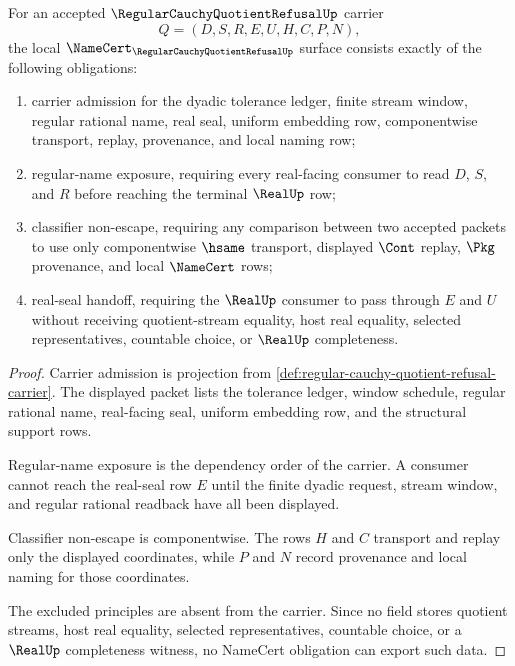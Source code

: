 \begin{theorem}
\label{thm:regular-cauchy-quotient-refusal-namecert-obligations}
For an accepted $\RegularCauchyQuotientRefusalUp$ carrier
$$
Q=(D,S,R,E,U,H,C,P,N),
$$
the local $\NameCert_{\RegularCauchyQuotientRefusalUp}$ surface consists exactly of the following obligations:
\begin{enumerate}
\item carrier admission for the dyadic tolerance ledger, finite stream window, regular rational name, real seal, uniform embedding row, componentwise transport, replay, provenance, and local naming row;
\item regular-name exposure, requiring every real-facing consumer to read $D$, $S$, and $R$ before reaching the terminal $\RealUp$ row;
\item classifier non-escape, requiring any comparison between two accepted packets to use only componentwise $\hsame$ transport, displayed $\Cont$ replay, $\Pkg$ provenance, and local $\NameCert$ rows;
\item real-seal handoff, requiring the $\RealUp$ consumer to pass through $E$ and $U$ without receiving quotient-stream equality, host real equality, selected representatives, countable choice, or $\RealUp$ completeness.
\end{enumerate}
\end{theorem}
\begin{proof}
Carrier admission is projection from \autoref{def:regular-cauchy-quotient-refusal-carrier}. The displayed packet lists the tolerance ledger, window schedule, regular rational name, real-facing seal, uniform embedding row, and the structural support rows.

Regular-name exposure is the dependency order of the carrier. A consumer cannot reach the real-seal row $E$ until the finite dyadic request, stream window, and regular rational readback have all been displayed.

Classifier non-escape is componentwise. The rows $H$ and $C$ transport and replay only the displayed coordinates, while $P$ and $N$ record provenance and local naming for those coordinates.

The excluded principles are absent from the carrier. Since no field stores quotient streams, host real equality, selected representatives, countable choice, or a $\RealUp$ completeness witness, no NameCert obligation can export such data.
\end{proof}

